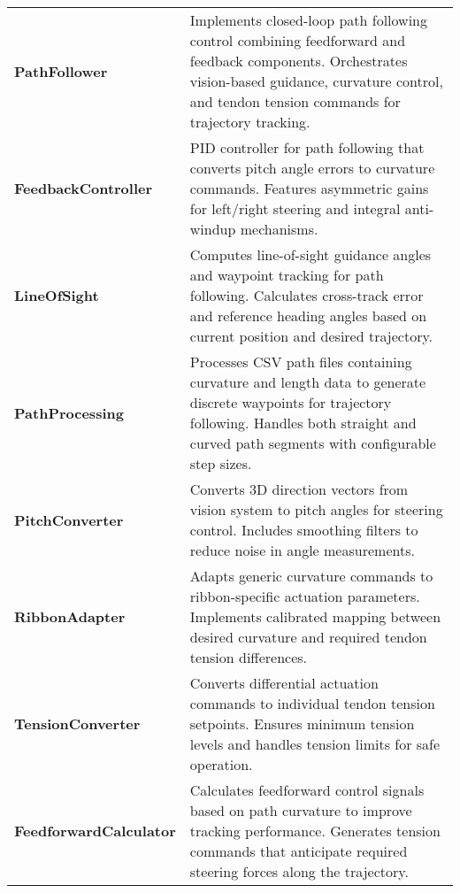\begin{longtable}{|>{\raggedright\arraybackslash}p{}|>{\raggedright\arraybackslash}p{}|}
\rowcolor{folderblue}
\multicolumn{2}{|c|}{\textcolor{white}{\textbf{\large  Path Following (pathfollowing/)}}} \\
\midrule
\cellcolor{lightblue}\textbf{PathFollower} & Implements closed-loop path following control combining feedforward and feedback components. Orchestrates vision-based guidance, curvature control, and tendon tension commands for trajectory tracking. \\
\hline
\cellcolor{lightblue}\textbf{FeedbackController} & PID controller for path following that converts pitch angle errors to curvature commands. Features asymmetric gains for left/right steering and integral anti-windup mechanisms. \\
\hline
\cellcolor{lightblue}\textbf{LineOfSight} & Computes line-of-sight guidance angles and waypoint tracking for path following. Calculates cross-track error and reference heading angles based on current position and desired trajectory. \\
\hline
\cellcolor{lightblue}\textbf{PathProcessing} & Processes CSV path files containing curvature and length data to generate discrete waypoints for trajectory following. Handles both straight and curved path segments with configurable step sizes. \\
\hline
\cellcolor{lightblue}\textbf{PitchConverter} & Converts 3D direction vectors from vision system to pitch angles for steering control. Includes smoothing filters to reduce noise in angle measurements. \\
\hline
\cellcolor{lightblue}\textbf{RibbonAdapter} & Adapts generic curvature commands to ribbon-specific actuation parameters. Implements calibrated mapping between desired curvature and required tendon tension differences. \\
\hline
\cellcolor{lightblue}\textbf{TensionConverter} & Converts differential actuation commands to individual tendon tension setpoints. Ensures minimum tension levels and handles tension limits for safe operation. \\
\hline
\cellcolor{lightblue}\textbf{FeedforwardCalculator} & Calculates feedforward control signals based on path curvature to improve tracking performance. Generates tension commands that anticipate required steering forces along the trajectory. \\

\end{longtable}


